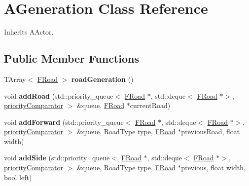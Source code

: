 \hypertarget{class_a_generation}{}\section{A\+Generation Class Reference}
\label{class_a_generation}


Inherits A\+Actor.

\subsection*{Public Member Functions}
\begin{DoxyCompactItemize}
\item 
\mbox{\label{class_a_generation_a769fb2cdb7c107c32df67c00c9940b3c}} 
T\+Array$<$ \mbox{\hyperlink{struct_f_road}{F\+Road}} $>$ {\bfseries road\+Generation} ()
\item 
\mbox{\label{class_a_generation_adfc9494b921cb7c016b9ad92dd0ac394}} 
void {\bfseries add\+Road} (std\+::priority\+\_\+queue$<$ \mbox{\hyperlink{struct_f_road}{F\+Road}} $\ast$, std\+::deque$<$ \mbox{\hyperlink{struct_f_road}{F\+Road}} $\ast$$>$, \mbox{\hyperlink{structpriority_comparator}{priority\+Comparator}} $>$ \&queue, \mbox{\hyperlink{struct_f_road}{F\+Road}} $\ast$current\+Road)
\item 
\mbox{\label{class_a_generation_a62e60da94a64549129c663ba94f6bd20}} 
void {\bfseries add\+Forward} (std\+::priority\+\_\+queue$<$ \mbox{\hyperlink{struct_f_road}{F\+Road}} $\ast$, std\+::deque$<$ \mbox{\hyperlink{struct_f_road}{F\+Road}} $\ast$$>$, \mbox{\hyperlink{structpriority_comparator}{priority\+Comparator}} $>$ \&queue, Road\+Type type, \mbox{\hyperlink{struct_f_road}{F\+Road}} $\ast$previous\+Road, float width)
\item 
\mbox{\label{class_a_generation_a981a8729017849f954819043a6f4475d}} 
void {\bfseries add\+Side} (std\+::priority\+\_\+queue$<$ \mbox{\hyperlink{struct_f_road}{F\+Road}} $\ast$, std\+::deque$<$ \mbox{\hyperlink{struct_f_road}{F\+Road}} $\ast$$>$, \mbox{\hyperlink{structpriority_comparator}{priority\+Comparator}} $>$ \&queue, Road\+Type type, \mbox{\hyperlink{struct_f_road}{F\+Road}} $\ast$previous, float width, bool left)
\item 
\mbox{\label{class_a_generation_afb2eaef94cbe516d220e8d84df532a85}} 
$$
\end{DoxyCompactItemize}
